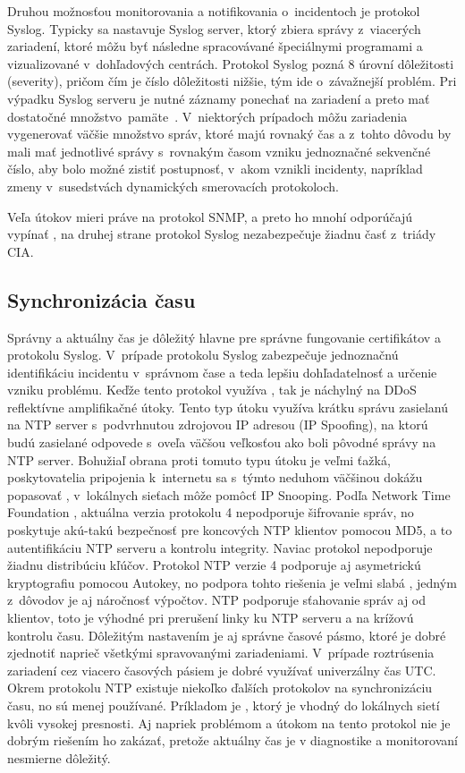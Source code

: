 Druhou možnosťou monitorovania a notifikovania o~incidentoch je protokol Syslog. Typicky sa nastavuje Syslog server, ktorý zbiera správy z~viacerých zariadení, ktoré môžu byť následne spracovávané špeciálnymi programami a vizualizované v~dohľadových centrách. Protokol Syslog pozná 8 úrovní dôležitosti (severity), pričom čím je číslo dôležitosti nižšie, tým ide o~závažnejší problém. Pri výpadku Syslog serveru je nutné záznamy ponechať na zariadení a preto mať dostatočné \mbox{množstvo pamäte \cite{Singh2018}\cite{uYLsMtQInofenpV3}}. V~niektorých prípadoch môžu zariadenia vygenerovať väčšie množstvo správ, ktoré majú rovnaký čas a z~tohto dôvodu by mali mať jednotlivé správy s~rovnakým časom vzniku jednoznačné sekvenčné číslo, aby bolo možné zistiť postupnosť, v~akom vznikli incidenty, napríklad zmeny v~susedstvách dynamických smerovacích protokoloch.

Veľa útokov mieri práve na protokol SNMP, a preto ho mnohí odporúčajú vypínať \cite{CIS_DrTLsgXv24lxeIIM}, na druhej strane protokol Syslog nezabezpečuje žiadnu časť z~triády CIA.   


\subsection{Synchronizácia času}
Správny a aktuálny čas je dôležitý hlavne pre správne fungovanie certifikátov a protokolu Syslog. V~prípade protokolu Syslog zabezpečuje jednoznačnú identifikáciu incidentu v~správnom čase a teda lepšiu dohľadatelnosť a určenie vzniku problému. Keďže tento protokol využíva , tak je náchylný na DDoS reflektívne amplifikačné útoky. Tento typ útoku využíva krátku správu zasielanú na NTP server s~podvrhnutou zdrojovou IP adresou (IP Spoofing), na ktorú budú zasielané odpovede s~oveľa väčšou veľkosťou ako boli pôvodné správy na NTP server. Bohužiaľ obrana proti tomuto typu útoku je veľmi ťažká, poskytovatelia pripojenia k~internetu sa s~týmto neduhom väčšinou dokážu popasovať \cite{gTkmbyKon9H6tuAm}, v~lokálnych sieťach môže pomôcť IP Snooping. Podľa Network Time Foundation \cite{s0goWNnWp5OjqREE}, aktuálna verzia protokolu 4 nepodporuje šifrovanie správ, no poskytuje akú-takú bezpečnosť pre koncových NTP klientov pomocou MD5, a to autentifikáciu NTP serveru a kontrolu integrity. Naviac protokol nepodporuje žiadnu distribúciu kľúčov. Protokol NTP verzie 4 podporuje aj asymetrickú kryptografiu pomocou Autokey, no podpora tohto riešenia je veľmi slabá \cite{s0goWNnWp5OjqREE}, jedným z~dôvodov je aj náročnosť výpočtov. NTP podporuje sťahovanie správ aj od klientov, toto je výhodné pri prerušení linky ku NTP serveru a na krížovú kontrolu času. Dôležitým nastavením je aj správne časové pásmo, ktoré je dobré zjednotiť naprieč všetkými spravovanými zariadeniami. V~prípade roztrúsenia zariadení cez viacero časových pásiem je dobré využívať univerzálny čas UTC. Okrem protokolu NTP existuje niekoľko ďalších protokolov na synchronizáciu času, no sú menej používané. Príkladom je , ktorý je vhodný do lokálnych sietí kvôli vysokej presnosti. Aj napriek problémom a útokom na tento protokol nie je dobrým riešením ho zakázať, pretože aktuálny čas je v diagnostike a monitorovaní nesmierne dôležitý.

